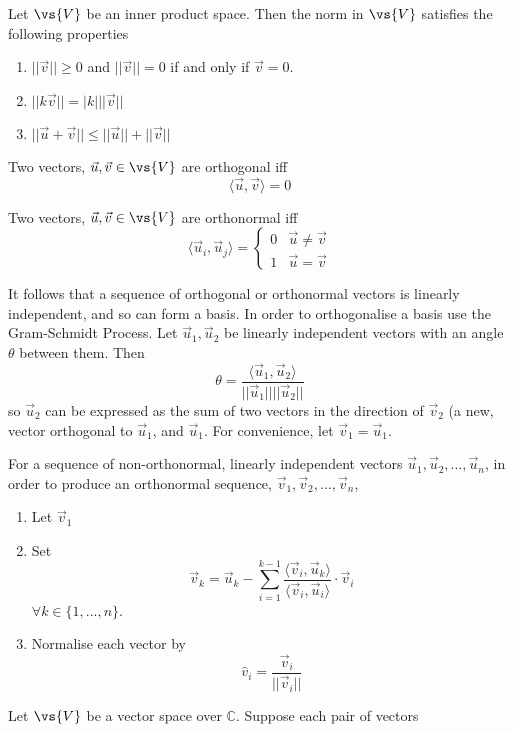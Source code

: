 \begin{theorem}
  Let $\vs{V}$ be an inner product space. Then the norm in $\vs{V}$ satisfies the following properties
  \begin{enumerate}
  \item $||\vec{v}|| \geq 0$ and $||\vec{v}||=0$ if and only if
    $\vec{v}=0$.
  \item $||k \vec{v}|| = |k| ||\vec{v}||$
  \item $||\vec{u} + \vec{v}|| \leq ||\vec{u}|| + ||\vec{v}||$
  \end{enumerate}
\end{theorem}
\begin{definition}
  Two vectors, $\vec{u}, \vec{v} \in \vs{V}$ are orthogonal iff
  \[ \langle \vec{u}, \vec{v} \rangle = 0 \]
\end{definition}
\begin{definition}
  Two vectors, $\vec{u}, \vec{v} \in \vs{V}$ are orthonormal iff
  \[ \langle \vec{u}_i, \vec{u}_j \rangle =
  \begin{cases}
    0 & \vec{u} \neq \vec{v} \\
    1 & \vec{u} = \vec{v}
  \end{cases}
  \]
\end{definition}
It follows that a sequence of orthogonal or orthonormal vectors is
linearly independent, and so can form a basis. In order to
orthogonalise a basis use the Gram-Schmidt Process.  Let $\vec{u}_1,
\vec{u}_2$ be linearly independent vectors with an angle $\theta$
between them. Then
\[ \theta = \frac{\langle \vec{u}_1, \vec{u}_2 \rangle}{||\vec{u}_1||
  || \vec{u}_2||} \] so $\vec{u}_2$ can be expressed as the sum of two
vectors in the direction of $\vec{v}_2$ (a new, vector orthogonal to
$\vec{u}_1$, and $\vec{u}_1$. For convenience, let $\vec{v}_1 = \vec{u}_1$.

\begin{algorithm}
  For a sequence of non-orthonormal, linearly independent vectors
  $\vec{u}_1, \vec{u}_2, \dots, \vec{u}_n$, in order to produce an
  orthonormal sequence, $\vec{v}_1, \vec{v}_2, \dots, \vec{v}_n$,
  \begin{enumerate}
  \item Let $\vec{v}_1$
  \item Set 
\[\vec{v}_k = \vec{u}_k - \sum_{i=1}^{k-1} \frac{\langle \vec{v}_i, \vec{u}_k \rangle}{\langle \vec{v}_i, \vec{u}_i \rangle} \cdot \vec{v}_i \]
$\forall k \in \{ 1, ..., n \}$.
\item Normalise each vector by \[ \hat{v}_i = \frac{\vec{v}_i}{||\vec{v}_i||} \]
  \end{enumerate}
\end{algorithm}
\begin{definition}
  Let $\vs{V}$ be a vector space over $\mathbb{C}$. Suppose each pair of vectors 
\end{definition}
